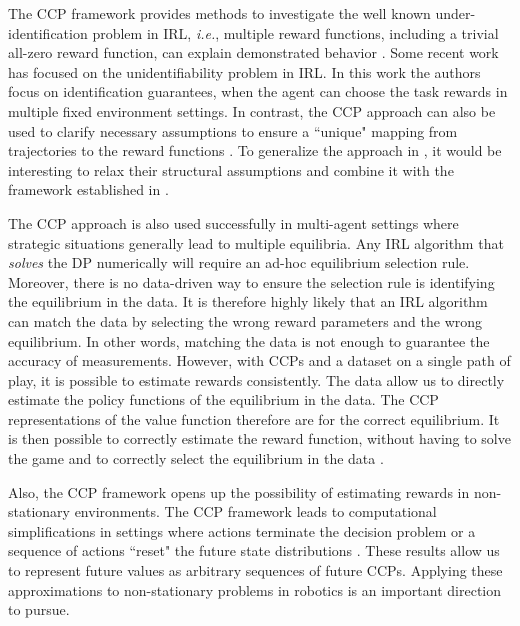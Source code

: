 \documentclass{article}
\begin{document}
The CCP framework provides methods to investigate the well known under-identification problem in IRL, \emph{i.e.}, multiple reward functions, including a trivial all-zero reward function, can explain demonstrated behavior \cite{abbeel2004apprenticeship}. Some recent work \cite{amin2016resolving} has focused on the unidentifiability problem in IRL. In this work the authors focus on identification guarantees, when the agent can choose the task rewards in multiple fixed environment settings. In contrast, the CCP approach can also be used to clarify necessary assumptions to ensure a ``unique" mapping from trajectories to the reward functions \cite{magnac}. To generalize the approach in \cite{magnac}, it would be interesting to relax their structural assumptions and combine it with the framework established in \cite{amin2016resolving}.

The CCP approach is also used successfully in multi-agent settings where strategic situations generally lead to multiple equilibria. Any IRL algorithm that \emph{solves} the DP numerically will require an ad-hoc equilibrium selection rule. Moreover, there is no data-driven way to ensure the selection rule is identifying the equilibrium in the data. It is therefore highly likely that an IRL algorithm can match the data by selecting the wrong reward parameters and the wrong equilibrium. In other words, matching the data is not enough to guarantee the accuracy of measurements. However, with CCPs and a dataset on a single path of play, it is possible to estimate rewards consistently. The data allow us to directly estimate the policy functions of the equilibrium in the data. The CCP representations of the value function therefore are for the correct equilibrium. It is then possible to correctly estimate the reward function, without having to solve the game and to correctly select the equilibrium in the data \cite{pese}.

Also, the CCP framework opens up the possibility of estimating rewards in non-stationary environments. The CCP framework leads to computational simplifications in settings where actions terminate the decision problem or a sequence of actions ``reset" the future state distributions \cite{arcidiacono2014nonstationary}. These results allow us to represent future values as arbitrary sequences of future CCPs.
Applying these approximations to non-stationary problems in robotics \cite{ma2017forecasting} is an important direction to pursue.

\end{document}
